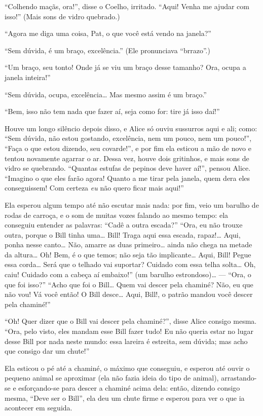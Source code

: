 ``Colhendo maçãs, ora!'', disse o Coelho, irritado. ``Aqui! Venha me
ajudar com isso!'' (Mais sons de vidro quebrado.)

``Agora me diga uma coisa, Pat, o que você está vendo na janela?''

``Sem dúvida, é um braço, excelência.'' (Ele pronunciava ``brrazo''.)

``Um braço, seu tonto! Onde já se viu um braço desse tamanho? Ora, ocupa
a janela inteira!''

``Sem dúvida, ocupa, excelência\ldots{} Mas mesmo assim é um braço.''

``Bem, isso não tem nada que fazer aí, seja como for: tire já isso
daí!''

Houve um longo silêncio depois disso, e Alice só ouviu sussurros aqui e
ali; como: ``Sem dúvida, não estou gostando, excelência, nem um pouco,
nem um pouco!'', ``Faça o que estou dizendo, seu covarde!'', e por fim ela
esticou a mão de novo e tentou novamente agarrar o ar. Dessa vez, houve
dois gritinhos, e mais sons de vidro se quebrando. ``Quantas estufas de
pepinos deve haver aí!'', pensou Alice. ``Imagino o que eles farão agora!
Quanto a me tirar pela janela, quem dera eles conseguissem! Com certeza
\emph{eu} não quero ficar mais aqui!''

Ela esperou algum tempo até não escutar mais nada: por fim, veio um
barulho de rodas de carroça, e o som de muitas vozes falando ao mesmo
tempo: ela conseguiu entender as palavras: ``Cadê a outra escada?''
``Ora, eu não trouxe outra, porque o Bill tinha uma\ldots{} Bill! Traga aqui
essa escada, rapaz!\ldots{} Aqui, ponha nesse canto\ldots{} Não, amarre as duas
primeiro\ldots{} ainda não chega na metade da altura\ldots{} Oh! Bem, é o que
temos; não seja tão implicante\ldots{} Aqui, Bill! Pegue essa corda\ldots{} Será
que o telhado vai suportar? Cuidado com essa telha solta\ldots{} Oh, caiu!
Cuidado com a cabeça aí embaixo!'' (um barulho estrondoso)\ldots{} --- ``Ora,
o que foi isso?'' ``Acho que foi o Bill\ldots{} Quem vai descer pela chaminé?
Não, eu que não vou! Vá você então! O Bill desce\ldots{} Aqui, Bill!, o
patrão mandou você descer pela chaminé!''

``Oh! Quer dizer que o Bill vai descer pela chaminé?'', disse Alice
consigo mesma. ``Ora, pelo visto, eles mandam esse Bill fazer tudo! Eu
não queria estar no lugar desse Bill por nada neste mundo: essa lareira
é estreita, sem dúvida; mas acho que consigo dar um chute!''

Ela esticou o pé até a chaminé, o máximo que conseguiu, e esperou até
ouvir o pequeno animal se aproximar (ela não fazia ideia do tipo de
animal), arrastando-se e esforçando-se para descer a chaminé acima dela:
então, dizendo consigo mesma, ``Deve ser o Bill'', ela deu um chute
firme e esperou para ver o que ia acontecer em seguida.


